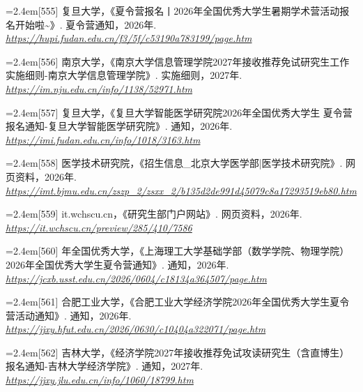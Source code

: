 {\par\noindent\hangindent=2.4em\label{src:S0206}{\color{cAccent}[555]} 复旦大学，《夏令营报名丨2026年全国优秀大学生暑期学术营活动报名开始啦\textasciitilde{}》. 夏令营通知，2026年. \textit{\url{https://hupi.fudan.edu.cn/f3/5f/c53190a783199/page.htm}}\par
\par\noindent\hangindent=2.4em\label{src:S0220}{\color{cAccent}[556]} 南京大学，《南京大学信息管理学院2027年接收推荐免试研究生工作实施细则-南京大学信息管理学院》. 实施细则，2027年. \textit{\url{https://im.nju.edu.cn/info/1138/52971.htm}}\par
\par\noindent\hangindent=2.4em\label{src:S0221}{\color{cAccent}[557]} 复旦大学，《复旦大学智能医学研究院2026年全国优秀大学生 夏令营报名通知-复旦大学智能医学研究院》. 通知，2026年. \textit{\url{https://imi.fudan.edu.cn/info/1018/3163.htm}}\par
\par\noindent\hangindent=2.4em\label{src:S0222}{\color{cAccent}[558]} 医学技术研究院，《招生信息\_北京大学医学部|医学技术研究院》. 网页资料，2026年. \textit{\url{https://imt.bjmu.edu.cn/zszp_2/zsxx_2/b135d2de991d45079c8a17293519eb80.htm}}\par
\par\noindent\hangindent=2.4em\label{src:S0224}{\color{cAccent}[559]} it.wchscu.cn，《研究生部门户网站》. 网页资料，2026年. \textit{\url{https://it.wchscu.cn/preview/285/410/7586}}\par
\par\noindent\hangindent=2.4em\label{src:S0226}{\color{cAccent}[560]} 年全国优秀大学，《上海理工大学基础学部（数学学院、物理学院）2026年全国优秀大学生夏令营通知》. 通知，2026年. \textit{\url{https://jcxb.usst.edu.cn/2026/0604/c18134a364507/page.htm}}\par
\par\noindent\hangindent=2.4em\label{src:S0227}{\color{cAccent}[561]} 合肥工业大学，《合肥工业大学经济学院2026年全国优秀大学生夏令营活动通知》. 通知，2026年. \textit{\url{https://jjxy.hfut.edu.cn/2026/0630/c10404a322071/page.htm}}\par
\par\noindent\hangindent=2.4em\label{src:S0229}{\color{cAccent}[562]} 吉林大学，《经济学院2027年接收推荐免试攻读研究生（含直博生）报名通知-吉林大学经济学院》. 通知，2027年. \textit{\url{https://jjxy.jlu.edu.cn/info/1060/18799.htm}}\par
}
